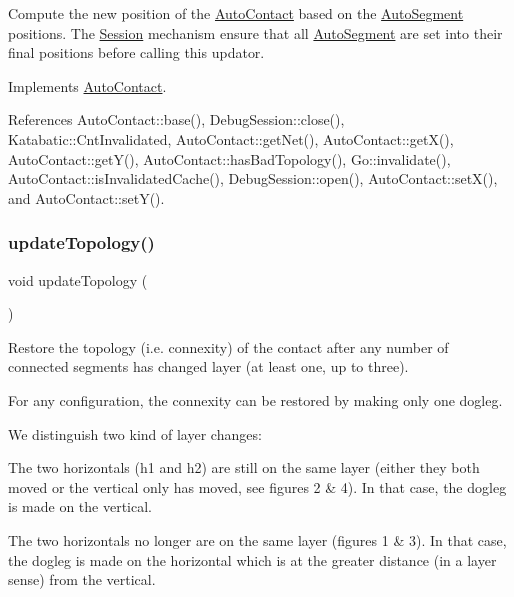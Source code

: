 Compute the new position of the \hyperlink{classKatabatic_1_1AutoContact}{Auto\+Contact} based on the \hyperlink{classKatabatic_1_1AutoSegment}{Auto\+Segment} positions. The \hyperlink{classKatabatic_1_1Session}{Session} mechanism ensure that all \hyperlink{classKatabatic_1_1AutoSegment}{Auto\+Segment} are set into their final positions before calling this updator. 

Implements \hyperlink{classKatabatic_1_1AutoContact_af6a2454547eeb7f5a519970dcb467e90}{Auto\+Contact}.



References Auto\+Contact\+::base(), Debug\+Session\+::close(), Katabatic\+::\+Cnt\+Invalidated, Auto\+Contact\+::get\+Net(), Auto\+Contact\+::get\+X(), Auto\+Contact\+::get\+Y(), Auto\+Contact\+::has\+Bad\+Topology(), Go\+::invalidate(), Auto\+Contact\+::is\+Invalidated\+Cache(), Debug\+Session\+::open(), Auto\+Contact\+::set\+X(), and Auto\+Contact\+::set\+Y().

\mbox{\label{classKatabatic_1_1AutoContactHTee_af5bf1f5e71204ef84346e4e036175431}} 
\subsubsection{\texorpdfstring{update\+Topology()}{updateTopology()}}
{\footnotesize\ttfamily void update\+Topology (\begin{DoxyParamCaption}{ }\end{DoxyParamCaption})\hspace{0.3cm}{\ttfamily [virtual]}}

Restore the topology (i.\+e. connexity) of the contact after any number of connected segments has changed layer (at least one, up to three).

For any configuration, the connexity can be restored by making only one dogleg.

We distinguish two kind of layer changes\+:
\begin{DoxyEnumerate}
\item The two horizontals ({\ttfamily h1} and {\ttfamily h2}) are still on the same layer (either they both moved or the vertical only has moved, see figures 2 \& 4). In that case, the dogleg is made on the vertical.
\item The two horizontals no longer are on the same layer (figures 1 \& 3). In that case, the dogleg is made on the horizontal which is at the greater distance (in a layer sense) from the vertical.
\end{DoxyEnumerate}

